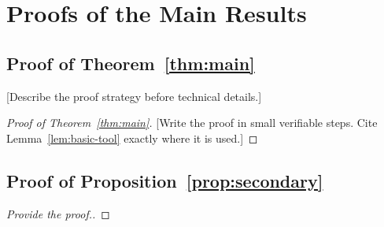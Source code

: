\section{Proofs of the Main Results}
\label{sec:proofs}

\subsection{Proof of Theorem~\ref{thm:main}}

[Describe the proof strategy before technical details.]

\begin{proof}[Proof of Theorem~\ref{thm:main}]
[Write the proof in small verifiable steps. Cite
Lemma~\ref{lem:basic-tool} exactly where it is used.]
\end{proof}

\subsection{Proof of Proposition~\ref{prop:secondary}}

\begin{proof}
[Provide the proof.]
\end{proof}
